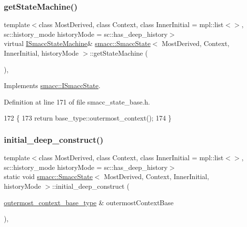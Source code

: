 \subsubsection{\texorpdfstring{get\+State\+Machine()}{getStateMachine()}}
{\footnotesize\ttfamily template$<$class Most\+Derived, class Context, class Inner\+Initial = mpl\+::list$<$$>$, sc\+::history\+\_\+mode history\+Mode = sc\+::has\+\_\+deep\+\_\+history$>$ \\
virtual \hyperlink{classsmacc_1_1ISmaccStateMachine}{I\+Smacc\+State\+Machine}\& \hyperlink{classsmacc_1_1SmaccState}{smacc\+::\+Smacc\+State}$<$ Most\+Derived, Context, Inner\+Initial, history\+Mode $>$\+::get\+State\+Machine (\begin{DoxyParamCaption}{ }\end{DoxyParamCaption})\hspace{0.3cm}{\ttfamily [inline]}, {\ttfamily [virtual]}}



Implements \hyperlink{classsmacc_1_1ISmaccState_a562bb3f9a3ac16b8be71e4794c9e7523}{smacc\+::\+I\+Smacc\+State}.



Definition at line 171 of file smacc\+\_\+state\+\_\+base.\+h.


\begin{DoxyCode}
172   \{
173     \textcolor{keywordflow}{return} base\_type::outermost\_context();
174   \}
\end{DoxyCode}
\mbox{\label{classsmacc_1_1SmaccState_af4b4635d16a32bdd3956e5d40ddbd01d}} 
\subsubsection{\texorpdfstring{initial\+\_\+deep\+\_\+construct()}{initial\_deep\_construct()}}
{\footnotesize\ttfamily template$<$class Most\+Derived, class Context, class Inner\+Initial = mpl\+::list$<$$>$, sc\+::history\+\_\+mode history\+Mode = sc\+::has\+\_\+deep\+\_\+history$>$ \\
static void \hyperlink{classsmacc_1_1SmaccState}{smacc\+::\+Smacc\+State}$<$ Most\+Derived, Context, Inner\+Initial, history\+Mode $>$\+::initial\+\_\+deep\+\_\+construct (\begin{DoxyParamCaption}\item[{\hyperlink{classsmacc_1_1SmaccState_aaf76bbe2aa9dd73e3284605f84ab4b16}{outermost\+\_\+context\+\_\+base\+\_\+type} \&}]{outermost\+Context\+Base }\end{DoxyParamCaption})\hspace{0.3cm}{\ttfamily [inline]}, {\ttfamily [static]}}



